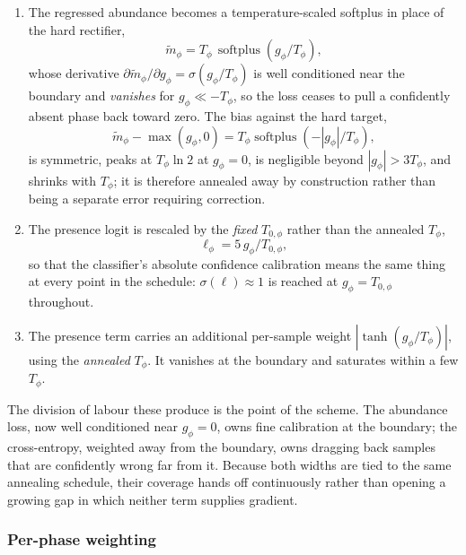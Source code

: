 \begin{enumerate}
\item The regressed abundance becomes a temperature-scaled softplus in place of the
hard rectifier,
\begin{equation}
  \tilde m_\phi = T_\phi\,\operatorname{softplus}(g_\phi/T_\phi),
  \label{eq:softmole}
\end{equation}
whose derivative $\partial \tilde m_\phi/\partial g_\phi = \sigma(g_\phi/T_\phi)$ is
well conditioned near the boundary and \emph{vanishes} for $g_\phi \ll -T_\phi$, so
the loss ceases to pull a confidently absent phase back toward zero. The bias against
the hard target,
\begin{equation}
  \tilde m_\phi - \max(g_\phi,0) = T_\phi\operatorname{softplus}(-|g_\phi|/T_\phi),
\end{equation}
is symmetric, peaks at $T_\phi\ln 2$ at $g_\phi=0$, is negligible beyond
$|g_\phi| > 3T_\phi$, and shrinks with $T_\phi$; it is therefore annealed away by
construction rather than being a separate error requiring correction.

\item The presence logit is rescaled by the \emph{fixed} $T_{0,\phi}$ rather than the
annealed $T_\phi$,
\begin{equation}
  \ell_\phi = 5\,g_\phi / T_{0,\phi},
\end{equation}
so that the classifier's absolute confidence calibration means the same thing at every
point in the schedule: $\sigma(\ell)\approx1$ is reached at $g_\phi = T_{0,\phi}$
throughout.

\item The presence term carries an additional per-sample weight
$|\tanh(g_\phi/T_\phi)|$, using the \emph{annealed} $T_\phi$. It vanishes at the
boundary and saturates within a few $T_\phi$.
\end{enumerate}

The division of labour these produce is the point of the scheme. The abundance loss,
now well conditioned near $g_\phi=0$, owns fine calibration at the boundary; the
cross-entropy, weighted away from the boundary, owns dragging back samples that are
confidently wrong far from it. Because both widths are tied to the same annealing
schedule, their coverage hands off continuously rather than opening a growing gap in
which neither term supplies gradient.

\subsubsection{Per-phase weighting}
\label{sec:phaseweights}

